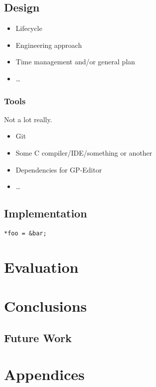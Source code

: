 \documentclass{UoYCSproject}
\begin{document}
\section{Design}
\begin{itemize}
	\item Lifecycle
 	\item Engineering approach
 	\item Time management and/or general plan
	\item \ldots
\end{itemize}
 
\subsection{Tools}
Not a lot really.
\begin{itemize}
  \item Git
  \item Some C compiler/IDE/something or another
  \item Dependencies for GP-Editor
  \item \ldots
\end{itemize}
\section{Implementation}


\begin{lstlisting}[label=c_1, caption=Placeholder C Code]
*foo = &bar;
\end{lstlisting}


\chapter{Evaluation}
\chapter{Conclusions}
\section{Future Work}

% 

\chapter{Appendices}
\end{document}

